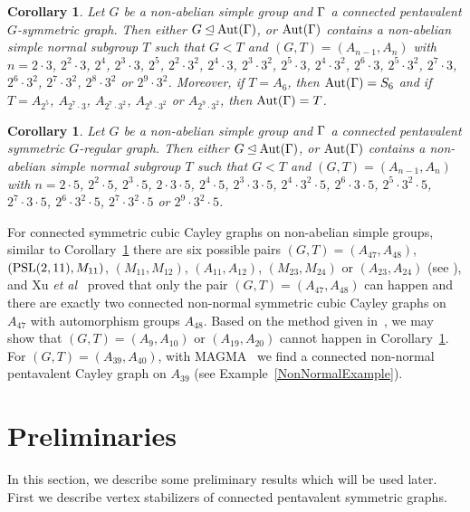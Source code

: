 \documentclass[12pt]{article}
\newtheorem{cor}[lem]{Corollary}%
\def\PSL{\hbox{\rm PSL}}\def\PSU{\hbox{\rm PSU}}
\def\Aut{\hbox{\rm Aut}}
\begin{document}
\begin{cor}\label{cor=arc}
Let $G$ be a non-abelian simple group and $\Gamma$ a connected pentavalent $G$-symmetric graph. Then either $G\unlhd \Aut(\G)$, or $\Aut(\G)$ contains a non-abelian simple normal subgroup $T$ such that $G<T$ and $(G,T)=(A_{n-1},A_n)$ with $n=2\cdot 3$, $2^2\cdot 3$, $2^4$, $2^3\cdot 3$, $2^5$, $2^2\cdot 3^2$, $2^4\cdot 3$, $2^3\cdot 3^2$, $2^5\cdot 3$, $2^4\cdot 3^2$,
$2^6\cdot 3$,  $2^5\cdot 3^2$, $2^7\cdot 3$, $2^6\cdot 3^2$, $2^7\cdot 3^2$,
$2^8\cdot 3^2$ or $2^9\cdot 3^2$.
Moreover, if $T=A_6$, then $\Aut(\G)=S_6$ and if $T=A_{2^5}$, $A_{2^7 \cdot 3}$, $A_{2^7 \cdot 3^2}$, $A_{2^8 \cdot 3^2}$ or $A_{2^9\cdot 3^2}$, then $\Aut(\G)=T$.
\end{cor}

\begin{cor}\label{cor=regular}
Let $G$ be a non-abelian simple group and $\Gamma$ a connected pentavalent symmetric $G$-regular graph. Then either $G\unlhd \Aut(\G)$, or $\Aut(\G)$ contains a non-abelian simple normal subgroup $T$ such that $G<T$ and $(G,T)=(A_{n-1},A_n)$ with $n=2\cdot 5$, $2^2\cdot 5$, $2^3\cdot5$, $2\cdot3\cdot 5$, $2^4\cdot5$, $2^3\cdot 3\cdot5$, $2^4\cdot 3^2\cdot5$, $2^6\cdot 3\cdot5$, $2^5\cdot 3^2\cdot5$, $2^7\cdot 3\cdot5$,
$2^6\cdot 3^2\cdot5$,  $2^7\cdot 3^2\cdot5$ or $2^9\cdot 3^2\cdot5$.
\end{cor}

For connected  symmetric cubic Cayley graphs on  non-abelian simple groups, similar to Corollary~\ref{cor=regular} there are six possible pairs $(G,T)=(A_{47},A_{48})$, $(\PSL(2,11),M_{11})$, $(M_{11},M_{12})$, $(A_{11}, A_{12})$, $(M_{23},M_{24})$ or $(A_{23},A_{24})$ (see \cite[Theorem 7.1.3]{CHLi}), and Xu {\em et al}~\cite{XFWX2005,XFWX} proved that only the pair $(G,T)=(A_{47},A_{48})$ can happen and there are exactly two connected non-normal symmetric cubic Cayley graphs on $A_{47}$ with automorphism groups $A_{48}$. Based on the method given in~\cite{XFWX2005,XFWX}, we may show that $(G,T)=(A_{9},A_{10})$ or $(A_{19},A_{20})$ cannot happen in Corollary~\ref{cor=regular}. For $(G,T)=(A_{39},A_{40})$, with MAGMA~\cite{magma} we find a connected non-normal pentavalent Cayley graph on $A_{39}$ (see Example~\ref{NonNormalExample}).

\section{Preliminaries\label{s2}}

In this section, we describe some preliminary results which will be used later. First we describe vertex stabilizers of connected pentavalent symmetric graphs.
\end{document}
